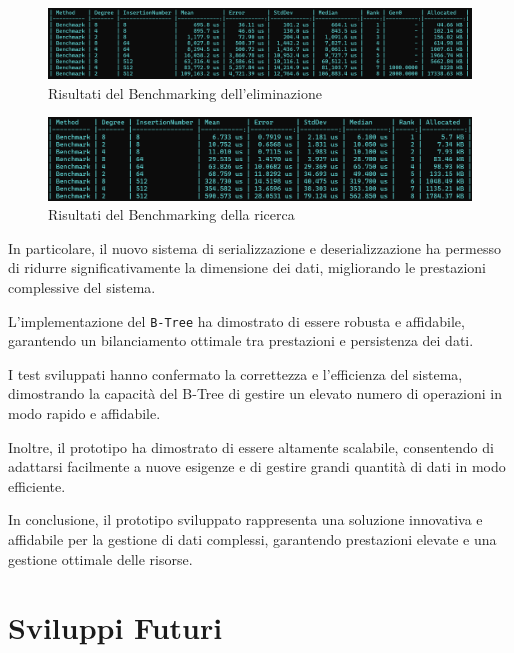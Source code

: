 \documentclass[12pt,a4paper,openright,twoside]{book}
\begin{document}
        \begin{figure} [h]
            \centering
            \includegraphics[width=1\linewidth]{figures/BenchmarkDelete.png}
            \caption{Risultati del Benchmarking dell'eliminazione}
            \label{fig:benchmarkB}
        \end{figure}

        \begin{figure} [h]
            \centering
            \includegraphics[width=1\linewidth]{figures/BenchmarkSearch.png}
            \caption{Risultati del Benchmarking della ricerca}
            \label{fig:benchmarkC}
        \end{figure}

        \pagebreak

        In particolare, il nuovo sistema di serializzazione e deserializzazione ha permesso di ridurre significativamente la dimensione dei dati, migliorando le prestazioni complessive del sistema.

        L'implementazione del \texttt{B-Tree} ha dimostrato di essere robusta e affidabile, garantendo un bilanciamento ottimale tra prestazioni e persistenza dei dati.

        I test sviluppati hanno confermato la correttezza e l'efficienza del sistema, dimostrando la capacità del B-Tree di gestire un elevato numero di operazioni in modo rapido e affidabile.

        Inoltre, il prototipo ha dimostrato di essere altamente scalabile, consentendo di adattarsi facilmente a nuove esigenze e di gestire grandi quantità di dati in modo efficiente.

        In conclusione, il prototipo sviluppato rappresenta una soluzione innovativa e affidabile per la gestione di dati complessi, garantendo prestazioni elevate e una gestione ottimale delle risorse.

        \pagebreak

    \section{Sviluppi Futuri}
\end{document}
